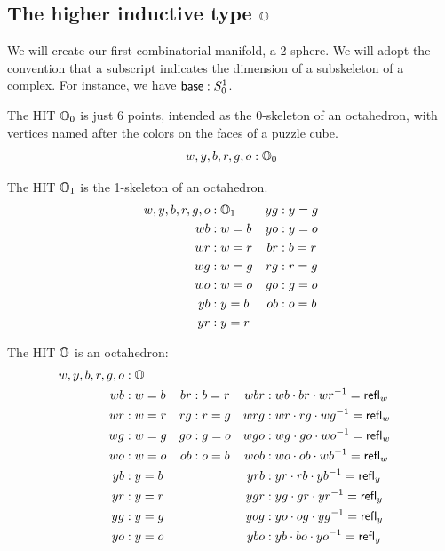 \subsection{\texorpdfstring{The higher inductive type \( \mathbb{O} \)}{The higher inductive type O}}

We will create our first combinatorial manifold, a 2-sphere. We will adopt the convention that a subscript indicates the dimension of a subskeleton of a complex. For instance, we have \( \mathsf{base}:S^1_0 \).

\begin{mydef}
The HIT \( \mathbb{O}_0 \) is just 6 points, intended as the 0-skeleton of an octahedron, with vertices named after the colors on the faces of a puzzle cube.
\[ w, y, b, r, g, o : \mathbb{O}_0 \]
\end{mydef}

\begin{mydef}
The HIT \( \mathbb{O}_1 \) is the 1-skeleton of an octahedron.
\begin{align*}
w, y, b, r, g, o &: \mathbb{O}_1 & yg &: y=g \\
wb &: w=b & yo &: y=o \\
wr &: w=r & br &: b=r \\
wg &: w=g & rg &: r=g \\
wo &: w=o & go &: g=o \\
yb &: y=b & ob &: o=b \\
yr &: y=r
\end{align*}
\end{mydef}

\begin{mydef}
The HIT \( \mathbb{O} \) is an octahedron:
\begin{align*}
w, y, b, r, g, o &: \mathbb{O} \\
wb &: w=b & br &: b=r & wbr &: wb\cdot br\cdot wr^{-1} = \mathsf{refl}_w \\
wr &: w=r & rg &: r=g & wrg &: wr\cdot rg\cdot wg^{-1} = \mathsf{refl}_w \\
wg &: w=g & go &: g=o & wgo &: wg\cdot go\cdot wo^{-1} = \mathsf{refl}_w \\
wo &: w=o & ob &: o=b & wob &: wo\cdot ob\cdot wb^{-1} = \mathsf{refl}_w \\
yb &: y=b & & & yrb &: yr\cdot rb\cdot yb^{-1} = \mathsf{refl}_y \\
yr &: y=r & & & ygr &: yg\cdot gr\cdot yr^{-1} = \mathsf{refl}_y \\
yg &: y=g & & & yog &: yo\cdot og\cdot yg^{-1} = \mathsf{refl}_y \\
yo &: y=o & & & ybo &: yb\cdot bo\cdot yo^{-1} = \mathsf{refl}_y 
\end{align*}
\end{mydef}

